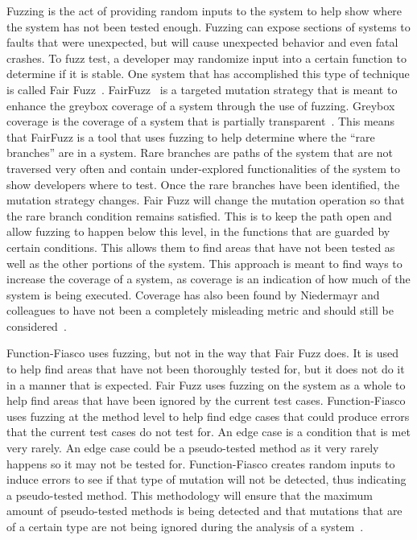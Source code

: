 Fuzzing is the act of providing random inputs to the system to help show where the system has not been tested enough. Fuzzing can expose sections of systems to faults that were unexpected, but will cause unexpected behavior and even fatal crashes. To fuzz test, a developer may randomize input into a certain function to determine if it is stable. One system that has accomplished this type of technique is called Fair Fuzz~\cite{lemieux2018fairfuzz}. FairFuzz~\cite{lemieux2018fairfuzz} is a targeted mutation strategy that is meant to enhance the greybox coverage of a system through the use of fuzzing. Greybox coverage is the coverage of a system that is partially transparent~\cite{karamcheti2018adaptive}. This means that FairFuzz is a tool that uses fuzzing to help determine where the ``rare branches'' are in a system. Rare branches are paths of the system that are not traversed very often and contain under-explored functionalities of the system to show developers where to test. Once the rare branches have been identified, the mutation strategy changes. Fair Fuzz will change the mutation operation so that the rare branch condition remains satisfied. This is to keep the path open and allow fuzzing to happen below this level, in the functions that are guarded by certain conditions. This allows them to find areas that have not been tested as well as the other portions of the system. This approach is meant to find ways to increase the coverage of a system, as coverage is an indication of how much of the system is being executed. Coverage has also been found by Niedermayr and colleagues to have not been a completely misleading metric and should still be considered~\cite{lemieux2018fairfuzz}.

Function-Fiasco uses fuzzing, but not in the way that Fair Fuzz does. It is used to help find areas that have not been thoroughly tested for, but it does not do it in a manner that is expected. Fair Fuzz uses fuzzing on the system as a whole to help find areas that have been ignored by the current test cases. Function-Fiasco uses fuzzing at the method level to help find edge cases that could produce errors that the current test cases do not test for. An edge case is a condition that is met very rarely. An edge case could be a pseudo-tested method as it very rarely happens so it may not be tested for. Function-Fiasco creates random inputs to induce errors to see if that type of mutation will not be detected, thus indicating a pseudo-tested method. This methodology will ensure that the maximum amount of pseudo-tested methods is being detected and that mutations that are of a certain type are not being ignored during the analysis of a system~\cite{lemieux2018fairfuzz}.

